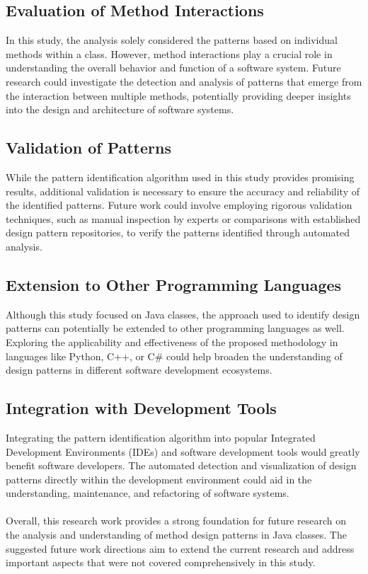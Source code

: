 \documentclass[draft]{article}
\begin{document}
\subsection{Evaluation of Method Interactions}
In this study, the analysis solely considered the patterns based on individual methods within a class. However, method interactions play a crucial role in understanding the overall behavior and function of a software system. Future research could investigate the detection and analysis of patterns that emerge from the interaction between multiple methods, potentially providing deeper insights into the design and architecture of software systems.
\subsection{Validation of Patterns}
While the pattern identification algorithm used in this study provides promising results, additional validation is necessary to ensure the accuracy and reliability of the identified patterns. Future work could involve employing rigorous validation techniques, such as manual inspection by experts or comparisons with established design pattern repositories, to verify the patterns identified through automated analysis.
\subsection{Extension to Other Programming Languages}
Although this study focused on Java classes, the approach used to identify design patterns can potentially be extended to other programming languages as well. Exploring the applicability and effectiveness of the proposed methodology in languages like Python, C++, or C\# could help broaden the understanding of design patterns in different software development ecosystems.
\subsection{Integration with Development Tools}
Integrating the pattern identification algorithm into popular Integrated Development Environments (IDEs) and software development tools would greatly benefit software developers. The automated detection and visualization of design patterns directly within the development environment could aid in the understanding, maintenance, and refactoring of software systems.\\
~\\
Overall, this research work provides a strong foundation for future research on the analysis and understanding of method design patterns in Java classes. The suggested future work directions aim to extend the current research and address important aspects that were not covered comprehensively in this study.\\
~\\
\end{document}
